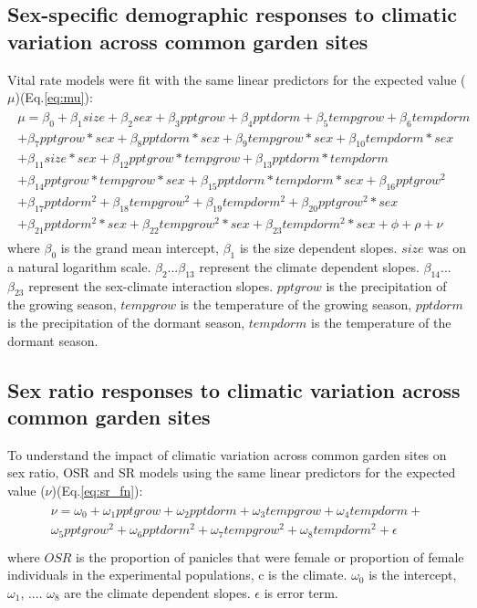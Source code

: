 \documentclass[12pt]{article}\usepackage[]{graphicx}\usepackage[dvipsnames]{xcolor}
\begin{document}
\subsection{Sex-specific demographic responses to climatic variation across common garden sites} \label {sssec:vital_rate}
Vital rate models were fit with the same linear predictors for the expected value ($\mu$)(Eq.\ref{eq:mu}):
\begin{align}\label{eq:mu}
\begin{split}
\mu = \beta_{0} + \beta_{1}size + \beta_{2}sex + \beta_{3}pptgrow + \beta_{4}pptdorm + \beta_{5}tempgrow + \beta_{6}tempdorm \\ 
+ \beta_{7}pptgrow*sex + \beta_{8}pptdorm*sex + \beta_{9}tempgrow*sex + \beta_{10}tempdorm*sex  \\ 
+  \beta_{11}size*sex + \beta_{12}pptgrow*tempgrow + \beta_{13}pptdorm*tempdorm\\
+ \beta_{14}pptgrow*tempgrow*sex + \beta_{15}pptdorm*tempdorm*sex + \beta_{16}pptgrow^2\\
+ \beta_{17}pptdorm^2 + \beta_{18}tempgrow^2 + \beta_{19}tempdorm^2 + \beta_{20}pptgrow^2*sex  \\
+ \beta_{21}pptdorm^2*sex + \beta_{22}tempgrow^2*sex + \beta_{23}tempdorm^2*sex + \phi + \rho + \nu 
\end{split}
\end{align}
\noindent where $\beta_{0}$ is the  grand mean intercept, $\beta_{1}$ is the size dependent slopes.
$size$ was on a natural logarithm scale. 
$\beta_{2}$...$\beta_{13}$ represent the climate dependent slopes.
$\beta_{14}$...$\beta_{23}$ represent the sex-climate interaction slopes.
$pptgrow$ is the precipitation of the growing season, $tempgrow$ is the temperature of the growing season, $pptdorm$ is the precipitation of the dormant season, $tempdorm$ is the temperature of the dormant season.

\subsection{Sex ratio responses to climatic variation across common garden sites} \label {sssec:sexratio_bayesian}
To understand the impact of climatic variation across common garden sites on sex ratio, OSR and SR  models using  the same linear predictors for the expected value ($\nu$)(Eq.\ref{eq:sr_fn}):
\begin{align}\label{eq:sr_fn}
\begin{split}
	\nu =   \omega_{0}+ \omega_{1}pptgrow + \omega_{2}pptdorm + \omega_{3}tempgrow + \omega_{4}tempdorm + \\
	  \omega_{5}pptgrow^2 + \omega_{6}pptdorm^2 + \omega_{7}tempgrow^2 + \omega_{8}tempdorm^2 + \epsilon\\
\end{split}
\end{align}
\noindent where $OSR$ is the proportion of panicles that were female or proportion of female individuals in the experimental populations, c is the climate. 
$\omega_{0}$ is the intercept, $\omega_{1}$, .... $\omega_{8}$ are the climate dependent slopes. $\epsilon$ is error term.
\end{document}
